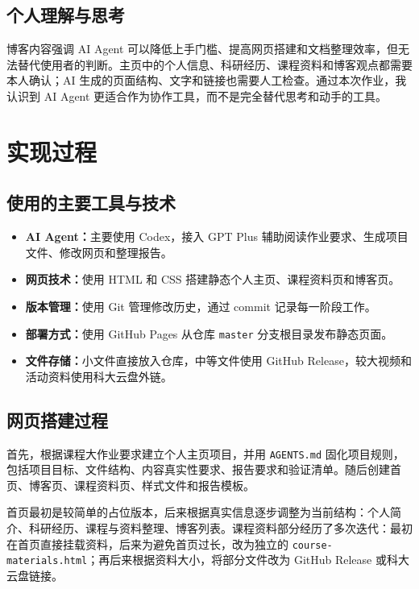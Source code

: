 \documentclass[UTF8,a4paper,12pt]{ctexart}
\begin{document}
\subsection{个人理解与思考}

博客内容强调 AI Agent 可以降低上手门槛、提高网页搭建和文档整理效率，但无法替代使用者的判断。主页中的个人信息、科研经历、课程资料和博客观点都需要本人确认；AI 生成的页面结构、文字和链接也需要人工检查。通过本次作业，我认识到 AI Agent 更适合作为协作工具，而不是完全替代思考和动手的工具。

\section{实现过程}

\subsection{使用的主要工具与技术}

\begin{itemize}
  \item \textbf{AI Agent：}主要使用 Codex，接入 GPT Plus 辅助阅读作业要求、生成项目文件、修改网页和整理报告。
  \item \textbf{网页技术：}使用 HTML 和 CSS 搭建静态个人主页、课程资料页和博客页。
  \item \textbf{版本管理：}使用 Git 管理修改历史，通过 commit 记录每一阶段工作。
  \item \textbf{部署方式：}使用 GitHub Pages 从仓库 \texttt{master} 分支根目录发布静态页面。
  \item \textbf{文件存储：}小文件直接放入仓库，中等文件使用 GitHub Release，较大视频和活动资料使用科大云盘外链。
\end{itemize}

\subsection{网页搭建过程}

首先，根据课程大作业要求建立个人主页项目，并用 \texttt{AGENTS.md} 固化项目规则，包括项目目标、文件结构、内容真实性要求、报告要求和验证清单。随后创建首页、博客页、课程资料页、样式文件和报告模板。

首页最初是较简单的占位版本，后来根据真实信息逐步调整为当前结构：个人简介、科研经历、课程与资料整理、博客列表。课程资料部分经历了多次迭代：最初在首页直接挂载资料，后来为避免首页过长，改为独立的 \texttt{course-materials.html}；再后来根据资料大小，将部分文件改为 GitHub Release 或科大云盘链接。
\end{document}
